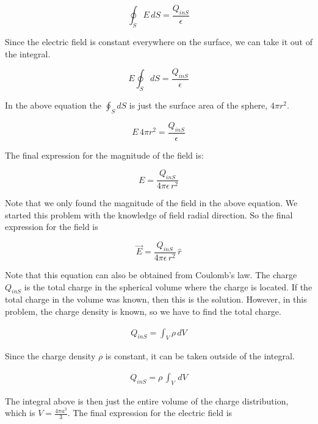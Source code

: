 \documentclass{ximera}
\begin{document}
\begin{equation}
\oint_S E \,dS  = \frac{Q_{inS}}{\epsilon}
\end{equation}

Since the electric field is constant everywhere on the surface, we can take it out of the integral. 


\begin{equation}
 E \oint_S dS = \frac{Q_{inS}}{\epsilon}
\end{equation}

In the above equation the $\oint_S dS $ is just the surface area of the sphere, $4 \pi r^2$.


\begin{equation}
 E \, 4 \pi r^2 = \frac{Q_{inS}}{\epsilon}
\end{equation}

The final expression for the magnitude of the field is:


\begin{equation}
 E  = \frac{Q_{inS}}{4 \pi  \epsilon \, r^2}
\end{equation}

Note that we only found the magnitude of the field in the above equation. We started this problem with the knowledge of field radial direction. So the final expression for the field is

\begin{equation}
 \vec{E}  = \frac{Q_{inS}}{4 \pi  \epsilon \, r^2} \, \hat{r}
\end{equation}

Note that this equation can also be obtained from Coulomb's law. The charge $Q_{inS}$ is the total charge in the spherical volume where the charge is located. If the total charge in the volume was known, then this is the solution. However, in this problem, the charge density is known, so we have to find the total charge.

\begin{eqnarray}
Q_{inS}=\int_V \rho \, dV
\end{eqnarray}

Since the charge density $\rho$ is constant, it  can be taken outside of the integral.


\begin{eqnarray}
Q_{inS}=\rho \, \int_V \, dV
\end{eqnarray}

The integral above is then just the entire volume of the charge distribution, which is $V=\frac{4 \pi a^3}{3}$. The final expression for the electric field is 
\end{document}
